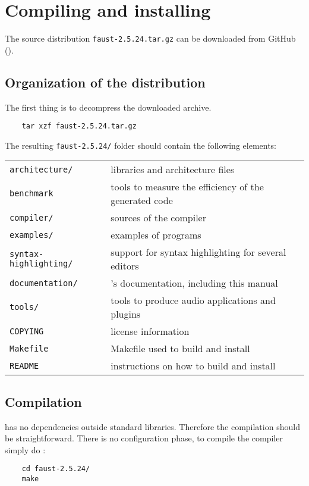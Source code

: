 \chapter{Compiling and installing \faust}

The \faust source distribution \lstinline'faust-2.5.24.tar.gz' can be downloaded from GitHub ().

\section{Organization of the distribution}
The first thing is to decompress the downloaded archive. 
\begin{lstlisting}
	tar xzf faust-2.5.24.tar.gz
\end{lstlisting}

The resulting  \lstinline'faust-2.5.24/' folder should contain the following elements:

\begin{tabular}{ll}
	\lstinline'architecture/' 		&\faust libraries and architecture files\\
	\lstinline'benchmark'			&tools to measure the efficiency of the generated code\\
	\lstinline'compiler/'			&sources of the \faust compiler\\
	\lstinline'examples/'			&examples of \faust programs\\
	\lstinline'syntax-highlighting/'&	support for syntax highlighting for several editors\\
	\lstinline'documentation/' 		&\faust's documentation, including this manual\\
	\lstinline'tools/'				&tools to produce audio applications and plugins\\
	\lstinline'COPYING'			&license information\\
	\lstinline'Makefile'			&Makefile used to build and install \faust\\
	\lstinline'README'			&instructions on how to build and install \faust
\end{tabular}

\section{Compilation}
\faust has no dependencies outside standard libraries. Therefore the compilation should be straightforward. There is no configuration phase, to compile the \faust compiler simply do :
\begin{lstlisting}
	cd faust-2.5.24/
	make
\end{lstlisting}

